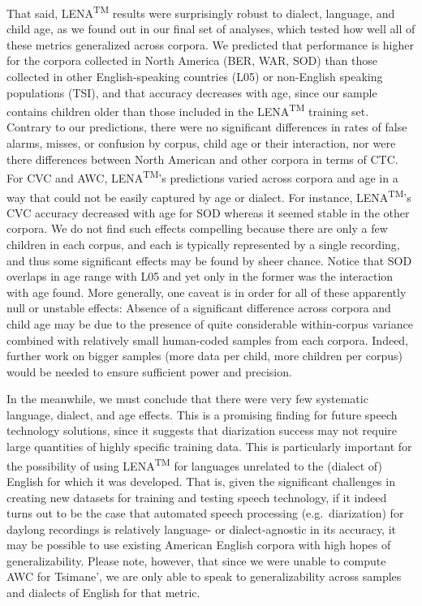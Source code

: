 \documentclass[english,table,man,floatsintext]{apa6}
\begin{document}
That said, LENA\textsuperscript{TM} results were surprisingly robust to dialect, language, and child age, as we found out in our final set of analyses, which tested how well all of these metrics generalized across corpora. We predicted that performance is higher for the corpora collected in North America (BER, WAR, SOD) than those collected in other English-speaking countries (L05) or non-English speaking populations (TSI), and that accuracy decreases with age, since our sample contains children older than those included in the LENA\textsuperscript{TM} training set. Contrary to our predictions, there were no significant differences in rates of false alarms, misses, or confusion by corpus, child age or their interaction, nor were there differences between North American and other corpora in terms of CTC. For CVC and AWC, LENA\textsuperscript{TM}'s predictions varied across corpora and age in a way that could not be easily captured by age or dialect. For instance, LENA\textsuperscript{TM}'s CVC accuracy decreased with age for SOD whereas it seemed stable in the other corpora. We do not find such effects compelling because there are only a few children in each corpus, and each is typically represented by a single recording, and thus some significant effects may be found by sheer chance. Notice that SOD overlaps in age range with L05 and yet only in the former was the interaction with age found. More generally, one caveat is in order for all of these apparently null or unstable effects: Absence of a significant difference across corpora and child age may be due to the presence of quite considerable within-corpus variance combined with relatively small human-coded samples from each corpora. Indeed, further work on bigger samples (more data per child, more children per corpus) would be needed to ensure sufficient power and precision.

In the meanwhile, we must conclude that there were very few systematic language, dialect, and age effects. This is a promising finding for future speech technology solutions, since it suggests that diarization success may not require large quantities of highly specific training data. This is particularly important for the possibility of using LENA\textsuperscript{TM} for languages unrelated to the (dialect of) English for which it was developed. That is, given the significant challenges in creating new datasets for training and testing speech technology, if it indeed turns out to be the case that automated speech processing (e.g.~diarization) for daylong recordings is relatively language- or dialect-agnostic in its accuracy, it may be possible to use existing American English corpora with high hopes of generalizability. Please note, however, that since we were unable to compute AWC for Tsimane', we are only able to speak to generalizability across samples and dialects of English for that metric.
\end{document}
